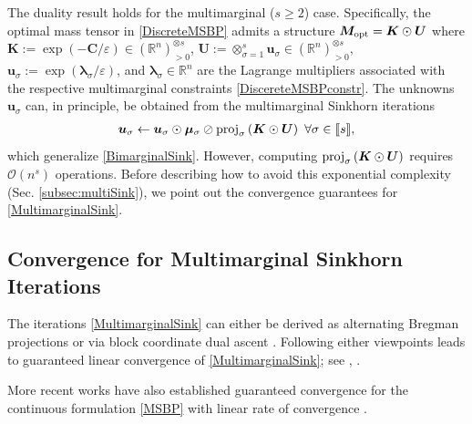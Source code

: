 \documentclass[letterpaper, 10pt, twocolumn]{ieeeconf}      %
\begin{document}
The duality result holds for the multimarginal ($s\geq 2$) case. Specifically, the optimal mass tensor in \eqref{DiscreteMSBP} admits a structure $\bm{M}_{\rm{opt}} = \bm{K}\odot\bm{U}$ where $\bm{K}:=\exp(-\bm{C}/\varepsilon)\in\left(\mathbb{R}^{n}\right)^{\otimes s}_{> 0}$, $\bm{U}:=\otimes_{\sigma=1}^{s}\bm{u}_{\sigma}\in\left(\mathbb{R}^{n}\right)^{\otimes s}_{> 0}$, $\bm{u}_{\sigma}:=\exp(\bm{\lambda}_{\sigma}/\varepsilon)$, and $\bm{\lambda}_{\sigma}\in\mathbb{R}^{n}$ are the Lagrange multipliers associated with the respective multimarginal constraints \eqref{DiscereteMSBPconstr}. The unknowns $\bm{u}_{\sigma}$ can, in principle, be obtained from the multimarginal Sinkhorn iterations \cite{benamou2015iterative}
\begin{align}
\bm{u}_{\sigma} \leftarrow \bm{u}_{\sigma} \odot \bm{\mu}_{\sigma}\oslash{\rm{proj}}_{\sigma}\left(\bm{K}\odot\bm{U}\right) ~\forall\sigma\in\llbracket s\rrbracket,
\label{MultimarginalSink}    
\end{align}
which generalize \eqref{BimarginalSink}. However, computing ${\rm{proj}}_{\sigma}\left(\bm{K}\odot\bm{U}\right)$ requires $\mathcal{O}\left(n^{s}\right)$ operations. Before describing how to avoid this exponential complexity (Sec. \ref{subsec:multiSink}), we point out the convergence guarantees for \eqref{MultimarginalSink}. 



\subsection{Convergence for Multimarginal Sinkhorn Iterations}\label{subsec:ConvergenceMultiSink}
\noindent
The iterations \eqref{MultimarginalSink} can either be derived as alternating Bregman projections \cite{benamou2015iterative} or via block coordinate dual ascent \cite{elvander2020multi}. Following either viewpoints leads to guaranteed linear convergence of \eqref{MultimarginalSink}; see \cite{bauschke2000dykstras}, \cite[Thm. 3.5]{haasler2021multimarginal}.

More recent works have also established \cite{marino2020optimal} guaranteed convergence for the continuous formulation \eqref{MSBP} with linear rate of convergence \cite{carlier2022linear}.
\end{document}
